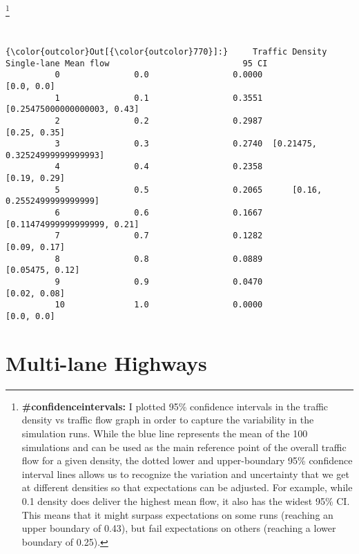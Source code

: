 \documentclass[11pt]{article}
\begin{document}
    \begin{center}
    \footnote{\textbf{\#confidenceintervals: }I plotted 95\% confidence intervals in the traffic density vs traffic flow graph in order to capture the variability in the simulation runs. While the blue line represents the mean of the 100 simulations and can be used as the main reference point of the overall traffic flow for a given density, the dotted lower and upper-boundary 95\% confidence interval lines allows us to recognize the variation and uncertainty that we get at different densities so that expectations can be adjusted. For example, while 0.1 density does deliver the highest mean flow, it also has the widest 95\% CI. This means that it might surpass expectations on some runs (reaching an upper boundary of 0.43), but fail expectations on others (reaching a lower boundary of 0.25).}
    
    \end{center}
    { \hspace*{\fill} \\}
    
\begin{Verbatim}[commandchars=\\\{\}]
{\color{outcolor}Out[{\color{outcolor}770}]:}     Traffic Density  Single-lane Mean flow                           95 CI
          0               0.0                 0.0000                      [0.0, 0.0]
          1               0.1                 0.3551     [0.25475000000000003, 0.43]
          2               0.2                 0.2987                    [0.25, 0.35]
          3               0.3                 0.2740  [0.21475, 0.32524999999999993]
          4               0.4                 0.2358                    [0.19, 0.29]
          5               0.5                 0.2065      [0.16, 0.2552499999999999]
          6               0.6                 0.1667     [0.11474999999999999, 0.21]
          7               0.7                 0.1282                    [0.09, 0.17]
          8               0.8                 0.0889                 [0.05475, 0.12]
          9               0.9                 0.0470                    [0.02, 0.08]
          10              1.0                 0.0000                      [0.0, 0.0]
\end{Verbatim}
            \newpage
\section{Multi-lane Highways}
\end{document}
